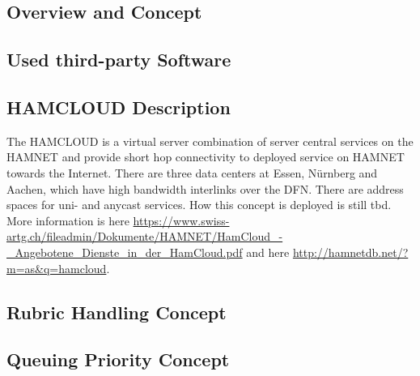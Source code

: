 \subsection{Overview and Concept}

\subsection{Used third-party Software}

\subsection{HAMCLOUD Description}
The HAMCLOUD is a virtual server combination of server central services on the HAMNET and provide short hop connectivity to deployed service on HAMNET towards the Internet. There are three data centers at Essen, Nürnberg and Aachen, which have high bandwidth interlinks over the DFN. There are address spaces for uni- and anycast services. How this concept is deployed is still tbd.
More information is here \url{https://www.swiss-artg.ch/fileadmin/Dokumente/HAMNET/HamCloud_-_Angebotene_Dienste_in_der_HamCloud.pdf} and here \url{http://hamnetdb.net/?m=as&q=hamcloud}.
\subsection{Rubric Handling Concept}

\subsection{Queuing Priority Concept}

